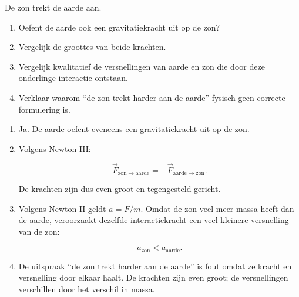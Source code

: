 \documentclass{ximera}
\begin{document}
\begin{oefening}{\oefU}

De zon trekt de aarde aan.

\begin{enumerate}
  \item Oefent de aarde ook een gravitatiekracht uit op de zon?
  \item Vergelijk de groottes van beide krachten.
  \item Vergelijk kwalitatief de versnellingen van aarde en zon die door
        deze onderlinge interactie ontstaan.
  \item Verklaar waarom ``de zon trekt harder aan de aarde'' fysisch
        geen correcte formulering is.
\end{enumerate}


\begin{oplossing}

\begin{enumerate}
  \item Ja. De aarde oefent eveneens een gravitatiekracht uit op de zon.

  \item Volgens Newton III:

  \[
  \boxed{
  \vec F_{\mathrm{zon}\to\mathrm{aarde}}
  =
  -\vec F_{\mathrm{aarde}\to\mathrm{zon}}.
  }
  \]

  De krachten zijn dus even groot en tegengesteld gericht.

  \item Volgens Newton II geldt $a=F/m$. Omdat de zon veel meer massa
  heeft dan de aarde, veroorzaakt dezelfde interactiekracht een veel
  kleinere versnelling van de zon:

  \[
  \boxed{
  a_\mathrm{zon}<a_\mathrm{aarde}.
  }
  \]

  \item De uitspraak ``de zon trekt harder aan de aarde'' is fout omdat
  ze kracht en versnelling door elkaar haalt. De krachten zijn even
  groot; de versnellingen verschillen door het verschil in massa.
\end{enumerate}

\end{oplossing}

\end{oefening}


\end{document}
